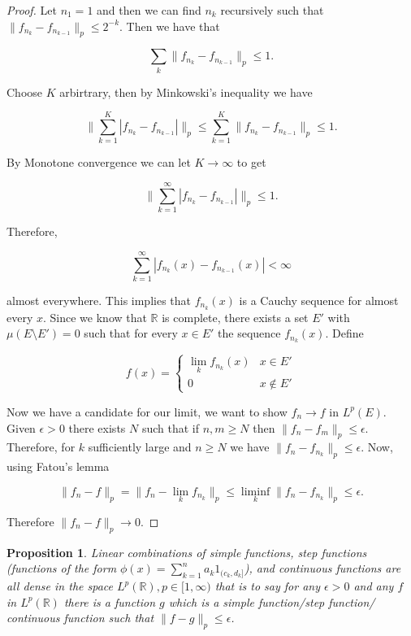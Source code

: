 \documentclass[
]{book}
\newtheorem{proposition}{Proposition}[chapter]
\theoremstyle{definition}
\theoremstyle{definition}
\theoremstyle{definition}
\theoremstyle{definition}
\theoremstyle{remark}
\begin{document}
\begin{proof}
Let \(n_1 = 1\) and then we can find \(n_k\) recursively such that \(\|f_{n_k}-f_{n_{k-1}}\|_p \leq 2^{-k}\). Then we have that

\[ \sum_k \|f_{n_k}-f_{n_{k-1}}\|_p \leq 1. \]

Choose \(K\) arbirtrary, then by Minkowski's inequality we have

\[ \| \sum_{k=1}^K |f_{n_k}-f_{n_{k-1}}| \|_p \leq  \sum_{k=1}^K \|f_{n_k}- f_{n_{k-1}}\|_p \leq 1.\]

By Monotone convergence we can let \(K \rightarrow \infty\) to get

\[ \| \sum_{k=1}^\infty |f_{n_k} - f_{n_{k-1}}| \|_p \leq 1. \]

Therefore,

\[ \sum_{k=1}^\infty |f_{n_k}(x) -f_{n_{k-1}}(x)| < \infty \]

almost everywhere. This implies that \(f_{n_k}(x)\) is a Cauchy sequence for almost every \(x\). Since we know that \(\mathbb{R}\) is complete, there exists a set \(E'\) with \(\mu(E\setminus E')=0\) such that for every \(x \in E'\) the sequence \(f_{n_k}(x)\). Define

\[ f(x) = \left\{ \begin{array}{ll} \lim_k f_{n_k}(x) & x \in E' \\ 0 & x \notin E' \end{array}\right. \]

Now we have a candidate for our limit, we want to show \(f_n \rightarrow f\) in \(L^p(E)\). Given \(\epsilon >0\) there exists \(N\) such that if \(n, m \geq N\) then \(\|f_n -f_m\|_p \leq \epsilon\). Therefore, for \(k\) sufficiently large and \(n \geq N\) we have \(\|f_n - f_{n_k}\|_p \leq \epsilon\). Now, using Fatou's lemma

\[ \|f_n -f\|_p = \|f_n - \lim_k f_{n_k}\|_p \leq \liminf_k \|f_n - f_{n_k}\|_p \leq \epsilon. \]

Therefore \(\|f_n - f\|_p \rightarrow 0.\)
\end{proof}

\begin{proposition}
Linear combinations of simple functions, step functions (functions of the form \(\phi(x) = \sum_{k=1}^n a_k 1_{(c_k,d_k]}\)), and continuous functions are all dense in the space \(L^p(\mathbb{R}), p \in [1,\infty)\) that is to say for any \(\epsilon > 0\) and any \(f\) in \(L^p(\mathbb{R})\) there is a function \(g\) which is a simple function/step function/ continuous function such that \(\|f-g\|_p \leq \epsilon\).
\end{proposition}
\end{document}

